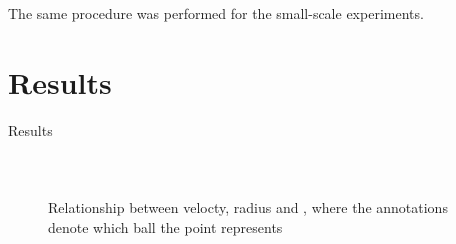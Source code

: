 \documentclass[11pt,a4paper]{article}
\begin{document}
    The same procedure was performed for the small-scale experiments.


\section{\label{sect:results}Results}


  \begin{table}[H]
    \center
    \caption{Results}
    \begin{tabular}{ r | l  l  l  l  l  l  l l  l }
      
    \end{tabular}
    \label{tab:results}
  \end{table}

  \begin{figure}[H]
    \center
    \\
    \caption{Relationship between velocty, radius and , where the annotations denote which ball the point represents}
    \label{fig:plots1}
  \end{figure}
\end{document}
